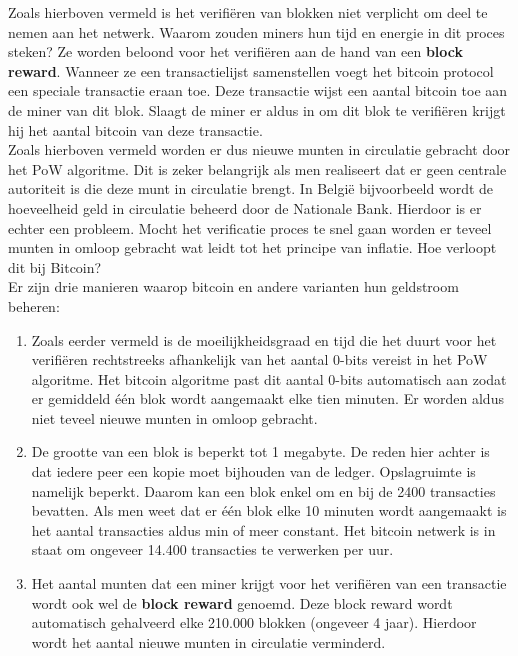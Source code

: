 Zoals hierboven vermeld is het verifiëren van blokken niet verplicht om deel te nemen aan het netwerk. Waarom zouden miners hun tijd en energie in dit proces steken? Ze worden beloond voor het verifiëren aan de hand van een \textbf{block reward}. Wanneer ze een transactielijst samenstellen voegt het bitcoin protocol een speciale transactie eraan toe. Deze transactie wijst een aantal bitcoin toe aan de miner van dit blok. Slaagt de miner er aldus in om dit blok te verifiëren krijgt hij het aantal bitcoin van deze transactie.\\

Zoals hierboven vermeld worden er dus nieuwe munten in circulatie gebracht door het PoW algoritme. Dit is zeker belangrijk als men realiseert dat er geen centrale autoriteit is die deze munt in circulatie brengt. In België bijvoorbeeld wordt de hoeveelheid geld in circulatie beheerd door de Nationale Bank. Hierdoor is er echter een probleem. Mocht het verificatie proces te snel gaan worden er teveel munten in omloop gebracht wat leidt tot het principe van inflatie. Hoe verloopt dit bij Bitcoin?\\

Er zijn drie manieren waarop bitcoin en andere varianten hun geldstroom beheren:

\begin{enumerate}

\item Zoals eerder vermeld is de moeilijkheidsgraad en tijd die het duurt voor het verifiëren rechtstreeks afhankelijk van het aantal 0-bits vereist in het PoW algoritme. Het bitcoin algoritme past dit aantal 0-bits automatisch aan zodat er gemiddeld één blok wordt aangemaakt elke tien minuten. Er worden aldus niet teveel nieuwe munten in omloop gebracht.\\

\item De grootte van een blok is beperkt tot 1 megabyte. De reden hier achter is dat iedere peer een kopie moet bijhouden van de ledger. Opslagruimte is namelijk beperkt. Daarom kan een blok enkel om en bij de 2400 transacties bevatten. Als men weet dat er één blok elke 10 minuten wordt aangemaakt is het aantal transacties aldus min of meer constant. Het bitcoin netwerk is in staat om ongeveer 14.400 transacties te verwerken per uur.\\

\item Het aantal munten dat een miner krijgt voor het verifiëren van een transactie wordt ook wel de \textbf{block reward} genoemd. Deze block reward wordt automatisch gehalveerd elke 210.000 blokken (ongeveer 4 jaar). Hierdoor wordt het aantal nieuwe munten in circulatie verminderd.\\
\end{enumerate}

